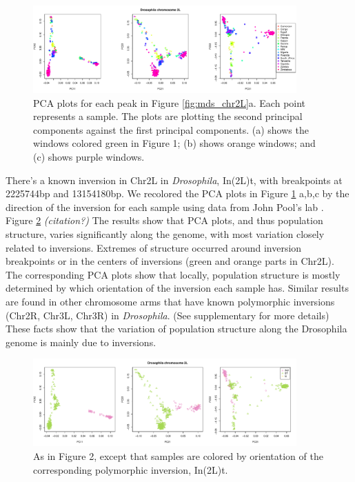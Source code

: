 \documentclass[11pt, oneside]{article}   	%
\newcommand{\plr}[1]{{\em \color{blue} #1}}
\begin{document}
\begin{figure}
    \begin{center}
       \includegraphics[width=0.9\textwidth]{Fig2_all_pca_plots_for_Chr2L_3peaks_byMDS}
    \end{center}
    \caption{
        PCA plots for each peak in Figure \ref{fig:mds_chr2L}a. 
        Each point represents a sample. 
        The plots are plotting the second principal components against the first principal components. 
        (a) shows the windows colored green in Figure 1; 
        (b) shows orange windows; and (c) shows purple windows.
         \label{fig:pca_chr2L}
    }
\end{figure}


There's a known inversion in Chr2L in \textit{Drosophila}, In(2L)t, with breakpoints at 2225744bp and 13154180bp. \citep{corbett2012population} We recolored the PCA plots in Figure \ref{fig:pca_chr2L} a,b,c by the direction of the inversion for each sample using data from John Pool's lab \citep{lack2015drosophila}. Figure \ref{fig:color_inver}
\plr{(citation?)}
The results show that PCA plots, and thus population structure, varies significantly along the genome, with most variation closely related to inversions. 
Extremes of structure occurred around inversion breakpoints or in the centers of inversions (green and orange parts in Chr2L).
The corresponding PCA plots show that locally, population structure is mostly determined by which orientation of the inversion each sample has.
Similar results are found in other chromosome arms that have known polymorphic inversions (Chr2R, Chr3L, Chr3R) in \textit{Drosophila}. (See supplementary for more details)
These facts show that the variation of population structure along the Drosophila genome is mainly due to inversions.

\begin{figure}
    \begin{center}
       \includegraphics[width=0.9\textwidth]{Fig3_all_pca_plots_for_Chr2L_3peaks_color_by_In2Lt_byMDS}
    \end{center}
    \caption{
         As in Figure 2, except that samples are colored by orientation of the corresponding polymorphic inversion, In(2L)t.
        \label{fig:color_inver}
    }
\end{figure}
\end{document}
